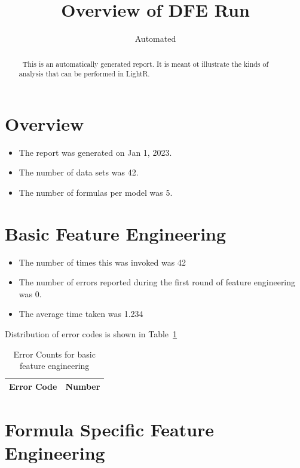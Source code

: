 \documentclass[letterpaper,12pt]{article}
\newcommand{\bi}{\begin{itemize}}
\newcommand{\ei}{\end{itemize}}
\newcommand{\ReportDate}{Jan 1, 2023}
\newcommand{\NumDataSets}{42}
\newcommand{\NumFormulas}{5}
\newcommand{\NumPLPErrorsA}{0}
\newcommand{\AvgTimePLPA}{1.234}
\begin{document}
\title{Overview of DFE Run}
\author{Automated}
\maketitle
\thispagestyle{fancy}
\lhead{}
\chead{}
\rhead{}
\cfoot{}
\rfoot{{\small \thepage}}

\begin{abstract}
\ This is an automatically generated report. It is meant ot illustrate the kinds
of analysis that can be performed in LightR.
\end{abstract}

\section{Overview}

\bi
\item The report was generated on \ReportDate. 
\item The number of data sets was \NumDataSets.
\item The number of formulas per model was \NumFormulas.
  \ei

\section{Basic Feature Engineering}
\label{PLP1}
\bi
\item The number of times this was invoked was \NumDataSets
\item The number of errors reported during the first round of feature
  engineering was \NumPLPErrorsA.
\item The average time taken was \AvgTimePLPA
\ei

Distribution of error codes is shown in Table~\ref{plp1_errs}
\begin{table}
  \centering
  \begin{tabular}{|l|l|} \hline \hline
    {\bf Error Code} & {\bf Number} \\ \hline 
     
    \hline
  \end{tabular}
  \caption{Error Counts for basic feature engineering}
  \label{plp1_errs}
\end{table}

\section{Formula Specific Feature Engineering}
\label{PLP2}
\end{document}
